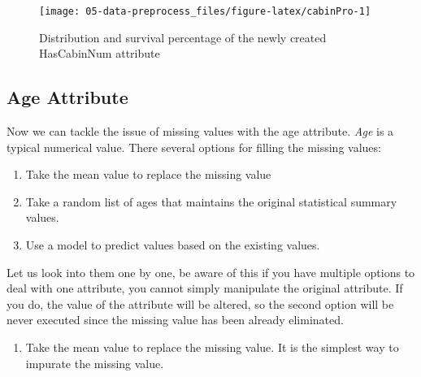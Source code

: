 \documentclass[
]{book}
\providecommand{\tightlist}{%
  \setlength{\itemsep}{0pt}\setlength{\parskip}{0pt}}
\begin{document}
\begin{figure}

{\centering \texttt{[image: 05-data-preprocess\_files/figure-latex/cabinPro-1]} 

}

\caption{Distribution and survival percentage of the newly created HasCabinNum attribute}\label{fig:cabinPro}
\end{figure}

\hypertarget{age-attribute}{%
\subsection*{Age Attribute}\label{age-attribute}}


Now we can tackle the issue of missing values with the age attribute. \emph{Age} is a typical numerical value. There several options for filling the missing values:

\begin{enumerate}
\def\labelenumi{\arabic{enumi}.}
\tightlist
\item
  Take the mean value to replace the missing value
\item
  Take a random list of ages that maintains the original statistical summary values.
\item
  Use a model to predict values based on the existing values.
\end{enumerate}

Let us look into them one by one, be aware of this if you have multiple options to deal with one attribute, you cannot simply manipulate the original attribute. If you do, the value of the attribute will be altered, so the second option will be never executed since the missing value has been already eliminated.

\begin{enumerate}
\def\labelenumi{\arabic{enumi}.}
\tightlist
\item
  Take the mean value to replace the missing value. It is the simplest way to impurate the missing value.
\end{enumerate}
\end{document}
